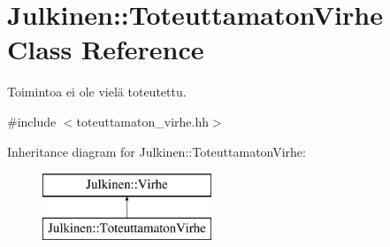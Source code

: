 \hypertarget{class_julkinen_1_1_toteuttamaton_virhe}{}\section{Julkinen\+:\+:Toteuttamaton\+Virhe Class Reference}
\label{class_julkinen_1_1_toteuttamaton_virhe}


Toimintoa ei ole vielä toteutettu.  




{\ttfamily \#include $<$toteuttamaton\+\_\+virhe.\+hh$>$}

Inheritance diagram for Julkinen\+:\+:Toteuttamaton\+Virhe\+:\begin{figure}[H]
\begin{center}
\leavevmode
\includegraphics[height=2.000000cm]{class_julkinen_1_1_toteuttamaton_virhe}
\end{center}
\end{figure}
